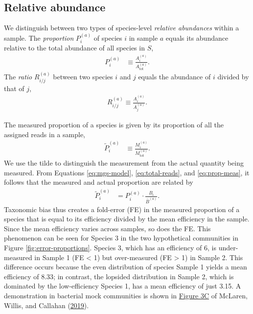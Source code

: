 \documentclass[
]{article}
\begin{document}
\hypertarget{relative-abundance}{%
\subsection{Relative abundance}\label{relative-abundance}}

We distinguish between two types of species-level \emph{relative abundances} within a sample.
The \emph{proportion} \(P_{i}^{(a)}\) of species \(i\) in sample \(a\) equals its abundance relative to the total abundance of all species in \(S\),
\begin{align}
  \label{eq:prop}
  P_{i}^{(a)} &\equiv \frac{A_i^{(a)}}{A_{\text{tot}}^{(a)}}.
\end{align}
The \emph{ratio} \(R_{i/j}^{(a)}\) between two species \(i\) and \(j\) equals the abundance of \(i\) divided by that of \(j\),
\begin{align}
  \label{eq:ratio}
  R_{i/j}^{(a)} \equiv \frac{A_i^{(a)}}{A_j^{(a)}}.
\end{align}

The measured proportion of a species is given by its proportion of all the assigned reads in a sample,
\begin{align}
  \label{eq:prop-meas}
  \tilde P_{i}^{(a)} &\equiv \frac{M_i^{(a)}}{M_{\text{tot}}^{(a)}}.
\end{align}
We use the tilde to distinguish the measurement from the actual quantity being measured.
From Equations \eqref{eq:mgs-model}, \eqref{eq:total-reads}, and \eqref{eq:prop-meas}, it follows that the measured and actual proportion are related by
\begin{align}
  \label{eq:prop-error}
  \tilde P_{i}^{(a)} &= P_{i}^{(a)} \cdot \frac{B_i}{\bar B^{(a)}}.
\end{align}
Taxonomic bias thus creates a fold-error (FE) in the measured proportion of a species that is equal to its efficiency divided by the mean efficiency in the sample.
Since the mean efficiency varies across samples, so does the FE.
This phenomenon can be seen for Species 3 in the two hypothetical communities in Figure \ref{fig:error-proportions}.
Species 3, which has an efficiency of 6, is under-measured in Sample 1 (FE \textless{} 1) but over-measured (FE \textgreater{} 1) in Sample 2.
This difference occurs because the even distribution of species Sample 1 yields a mean efficiency of 8.33; in contrast, the lopsided distribution in Sample 2, which is dominated by the low-efficiency Species 1, has a mean efficiency of just 3.15.
A demonstration in bacterial mock communities is shown in \href{https://doi.org/10.7554/eLife.46923.004}{Figure 3C} of McLaren, Willis, and Callahan (\protect\hyperlink{ref-mclaren2019cons}{2019}).
\end{document}
